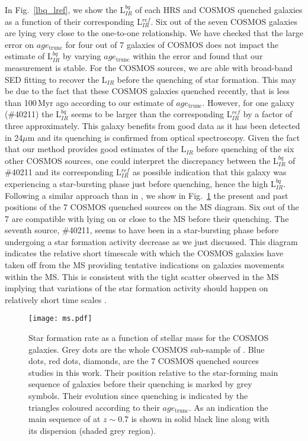 \documentclass[traditabstract]{aa} %
\begin{document}
In Fig.~\ref{lbq_lref}, we show the L$_{IR}^{bq}$ of each HRS and COSMOS quenched galaxies as a function of their corresponding L$_{IR}^{ref}$.
Six out of the seven COSMOS galaxies are lying very close to the one-to-one relationship.
We have checked that the large error on $age_{\mathrm{trunc}}$ for four out of 7 galaxies of COSMOS does not impact the estimate of L$_{IR}^{bq}$ by varying $age_{\mathrm{trunc}}$ within the error and found that our measurement is stable.
For the COSMOS sources, we are able with broad-band SED fitting to recover the L$_{IR}$ before the quenching of star formation.
This may be due to the fact that these COSMOS galaxies quenched recently, that is less than 100\,Myr ago according to our estimate of $age_{\mathrm{trunc}}$.
However, for one galaxy (\#40211) the L$_{IR}^{bq}$ seems to be larger than the corresponding L$_{IR}^{ref}$ by a factor of three approximately.
This galaxy benefits from good data as it has been detected in 24$\mu$m and its quenching is confirmed from optical spectroscopy.
Given the fact that our method provides good estimates of the L$_{IR}$ before quenching of the six other COSMOS sources, one could interpret the discrepancy between the L$_{IR}^{bq}$ of \#40211 and its corresponding L$_{IR}^{ref}$ as possible indication that this galaxy was experiencing a star-bursting phase just before quenching, hence the high L$_{IR}^{bq}$.
Following a similar approach than in \cite{Ciesla18}, we show in Fig.~\ref{ms} the present and past positions of the 7 COSMOS quenched sources on the MS diagram.
Six out of the 7 are compatible with lying on or close to the MS before their quenching.
The seventh source, \#40211, seems to have been in a star-bursting phase before undergoing a star formation activity decrease as we just discussed.
This diagram indicates the relative short timescale with which the COSMOS galaxies have taken off from the MS providing tentative indications on galaxies movements within the MS.
This is consistent with the tight scatter observed in the MS implying that variations of the star formation activity should happen on relatively short time scales \cite[e.g.][and references therein]{ForsterSchreiber20}.

\begin{figure}[!h] 
  	\texttt{[image: ms.pdf]}
  	\caption{\label{ms} Star formation rate as a function of stellar mass for the COSMOS galaxies. Grey dots are the whole COSMOS sub-sample of \cite{Aufort20}. Blue dots, red dots, diamonds, are the 7 COSMOS quenched sources studies in this work. Their position relative to the star-forming main sequence of galaxies before their quenching is marked by grey symbols. Their evolution since quenching is indicated by the triangles coloured according to their $age_{\mathrm{trunc}}$. As an indication the main sequence of \cite{Schreiber15} at $z\sim0.7$ is shown in solid black line along with its dispersion (shaded grey region). }
\end{figure}
\end{document}

